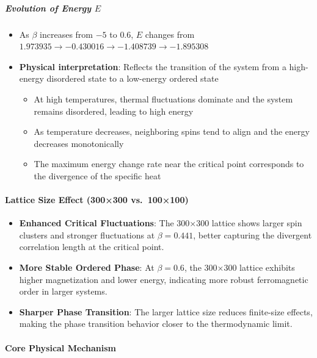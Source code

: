 \documentclass[11pt]{article}
\providecommand{\tightlist}{%
      \setlength{\itemsep}{0pt}\setlength{\parskip}{0pt}}
\begin{document}
\subparagraph{\texorpdfstring{Evolution of Energy
\(E\)}{Evolution of Energy E}}\label{evolution-of-energy-e}

\begin{itemize}
\tightlist
\item
  As \(\beta\) increases from \(-5\) to \(0.6\), \(E\) changes from\\
  \(1.973935 \rightarrow -0.430016 \rightarrow -1.408739 \rightarrow -1.895308\)
\item
  \textbf{Physical interpretation}: Reflects the transition of the
  system from a high-energy disordered state to a low-energy ordered
  state

  \begin{itemize}
  \tightlist
  \item
    At high temperatures, thermal fluctuations dominate and the system
    remains disordered, leading to high energy
  \item
    As temperature decreases, neighboring spins tend to align and the
    energy decreases monotonically
  \item
    The maximum energy change rate near the critical point corresponds
    to the divergence of the specific heat
  \end{itemize}
\end{itemize}

    \paragraph{Lattice Size Effect (300×300
vs.~100×100)}\label{lattice-size-effect-300300-vs.-100100}

\begin{itemize}
\tightlist
\item
  \textbf{Enhanced Critical Fluctuations}: The 300×300 lattice shows
  larger spin clusters and stronger fluctuations at \(\beta = 0.441\),
  better capturing the divergent correlation length at the critical
  point.
\item
  \textbf{More Stable Ordered Phase}: At \(\beta = 0.6\), the 300×300
  lattice exhibits higher magnetization and lower energy, indicating
  more robust ferromagnetic order in larger systems.
\item
  \textbf{Sharper Phase Transition}: The larger lattice size reduces
  finite-size effects, making the phase transition behavior closer to
  the thermodynamic limit.
\end{itemize}

\paragraph{Core Physical Mechanism}\label{core-physical-mechanism}
\end{document}
